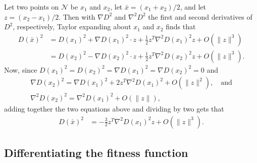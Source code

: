 \documentclass{article}
\newcommand{\grad}{\nabla}
\newcommand{\1}{\mathbbm{1}}
\newcommand{\allS}{\mathcal{N}}
\begin{document}
Let two points on $\allS$ be $x_1$ and $x_2$, let $\bar x = (x_1+x_2)/2$, and let $z=(x_2 - x_1)/2$.
Then with $\grad D^2$ and $\grad^2 D^2$ the first and second derivatives of $D^2$, respectively,
Taylor expanding about $x_1$ and $x_2$ finds that
\begin{align*}
    D(\bar x)^2 
    &= D(x_1)^2 + \grad D(x_1)^2 \cdot z + \frac{1}{2} z^T \grad^2  D(x_1)^2 z + O(\|z\|^3) \\
    &=  D(x_2)^2 - \grad D(x_2)^2 \cdot z + \frac{1}{2} z^T \grad^2  D(x_2)^2 z + O(\|z\|^3) .
\end{align*}
Now, since $ D(x_1)^2 =  D(x_2)^2 = \grad D(x_1)^2 = \grad D(x_2)^2 = 0$ and
\begin{align*}
    \grad D(x_2)^2 = \grad D(x_1)^2 + 2 z^T \grad^2  D(x_1)^2 + O(\|z\|^2), \quad \text{and} \\
    \grad^2 D(x_2)^2 = \grad^2 D(x_1)^2 + O(\|z\|), 
\end{align*}
adding together the two equations above and dividing by two gets that
\begin{align*}
     D(\bar x)^2
    &= - \frac{3}{2} z^T \grad^2  D(x_1)^2 z + O(\|z\|^3) .
\end{align*}

\subsection{Differentiating the fitness function}
\label{apx:H_calc}
\end{document}
